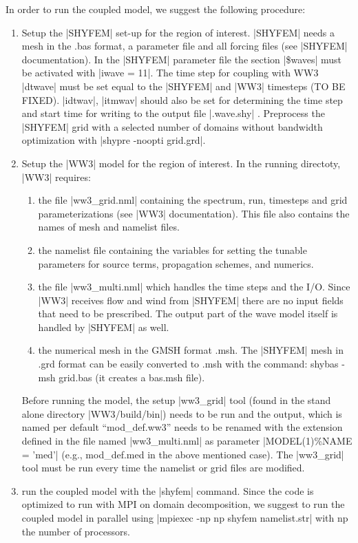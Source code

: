 In order to run the coupled model, we suggest the following
procedure:
\begin{enumerate}
\item Setup the |SHYFEM| set-up for the region of interest. 
|SHYFEM| needs a mesh in the .bas format, a parameter file and 
all forcing files (see |SHYFEM| documentation). In the |SHYFEM| 
parameter file the section |\$waves| must be activated with |iwave = 11|.
The time step for coupling with WW3 |dtwave| must be set equal
to the |SHYFEM| and |WW3| timesteps (TO BE FIXED).
|idtwav|, |itmwav| should also be set for determining the 
time step and start time for writing to the output file |.wave.shy| .
Preprocess the |SHYFEM| grid with a selected number of domains 
without bandwidth optimization with |shypre -noopti grid.grd|.

\item Setup the |WW3| model for the region of interest. In the
running directoty, |WW3| requires:
\begin{enumerate}
\item the file |ww3_grid.nml| containing the spectrum, run, timesteps
and grid parameterizations (see |WW3| documentation). This file also
contains the names of mesh and namelist files.
\item the namelist file containing the variables for setting
the tunable parameters for source terms, propagation schemes, and 
numerics.
\item the file |ww3_multi.nml| which handles the time steps and 
the I/O. Since |WW3| receives flow and wind from |SHYFEM| there are 
no input fields that need to be prescribed. The output part of the 
wave model itself is handled by |SHYFEM| as well.
\item the numerical mesh in the GMSH format .msh. The |SHYFEM|
mesh in .grd format can be easily converted to .msh with the command:
shybas -msh grid.bas (it creates a bas.msh file).
\end{enumerate}

Before running the model, the setup |ww3_grid| tool (found in the
stand alone directory |WW3/build/bin|) needs to be run and the output, 
which is named per default ``mod\_def.ww3'' needs to be renamed 
with the extension defined in the file named |ww3_multi.nml| 
as parameter |MODEL(1)\%NAME = 'med'|
(e.g., mod\_def.med in the above mentioned case). 
The |ww3_grid| tool must be run every time the namelist or grid files 
are modified. 

\item run the coupled model with the |shyfem| command. Since the code
is optimized to run with MPI on domain decomposition, we suggest to
run the coupled model in parallel using |mpiexec -np np shyfem namelist.str| 
with np the number of processors.

\end{enumerate}

